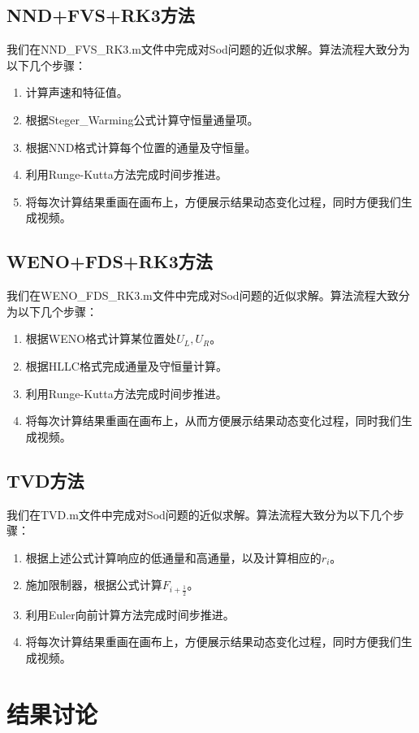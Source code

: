\documentclass[12pt,a4paper]{article}%
\begin{document}
		\subsection{NND+FVS+RK3方法}
		我们在NND\_FVS\_RK3.m文件中完成对Sod问题的近似求解。算法流程大致分为以下几个步骤：
		\begin{enumerate}
			\item 计算声速和特征值。
			\item 根据Steger\_Warming公式计算守恒量通量项。
			\item 根据NND格式计算每个位置的通量及守恒量。
			\item 利用Runge-Kutta方法完成时间步推进。
			\item 将每次计算结果重画在画布上，方便展示结果动态变化过程，同时方便我们生成视频。
		\end{enumerate}
		
		\subsection{WENO+FDS+RK3方法}
		我们在WENO\_FDS\_RK3.m文件中完成对Sod问题的近似求解。算法流程大致分为以下几个步骤：
		\begin{enumerate}
			\item 根据WENO格式计算某位置处$U_L,U_R$。
			\item 根据HLLC格式完成通量及守恒量计算。
			\item 利用Runge-Kutta方法完成时间步推进。
			\item 将每次计算结果重画在画布上，从而方便展示结果动态变化过程，同时我们生成视频。
		\end{enumerate}
		
		\subsection{TVD方法}
		我们在TVD.m文件中完成对Sod问题的近似求解。算法流程大致分为以下几个步骤：
		\begin{enumerate}
			\item 根据上述公式计算响应的低通量和高通量，以及计算相应的$r_i$。
			\item 施加限制器，根据公式计算$F_{i+\frac12}$。
			\item 利用Euler向前计算方法完成时间步推进。
			\item 将每次计算结果重画在画布上，方便展示结果动态变化过程，同时方便我们生成视频。
		\end{enumerate}

	\section{结果讨论}
\end{document}
